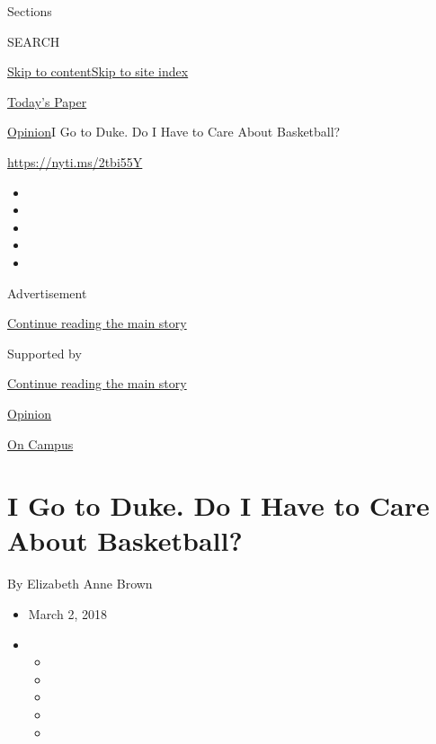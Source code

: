 Sections

SEARCH

\protect\hyperlink{site-content}{Skip to
content}\protect\hyperlink{site-index}{Skip to site index}

\href{https://myaccount.nytimes.com/auth/login?response_type=cookie\&client_id=vi}{}

\href{https://www.nytimes.com/section/todayspaper}{Today's Paper}

\href{/section/opinion}{Opinion}\textbar{}I Go to Duke. Do I Have to
Care About Basketball?

\href{https://nyti.ms/2tbi55Y}{https://nyti.ms/2tbi55Y}

\begin{itemize}
\item
\item
\item
\item
\item
\end{itemize}

Advertisement

\protect\hyperlink{after-top}{Continue reading the main story}

Supported by

\protect\hyperlink{after-sponsor}{Continue reading the main story}

\href{/section/opinion}{Opinion}

\href{/column/on-campus}{On Campus}

\hypertarget{i-go-to-duke-do-i-have-to-care-about-basketball}{%
\section{I Go to Duke. Do I Have to Care About
Basketball?}\label{i-go-to-duke-do-i-have-to-care-about-basketball}}

By Elizabeth Anne Brown

\begin{itemize}
\item
  March 2, 2018
\item
  \begin{itemize}
  \item
  \item
  \item
  \item
  \item
  \end{itemize}
\end{itemize}

